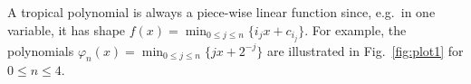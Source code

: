 A tropical polynomial is always a piece-wise linear function since, e.g.\ in one variable, it has shape $f(x)=\min_{0\leq j\leq n}\{i_{j}x+c_{i_{j}}\}$.
For example, the polynomials $\varphi_{n}(x)=\min_{0\leq j\leq n}\{jx+2^{-j}\}$
are illustrated in Fig.~\ref{fig:plot1} for $0\leq n \leq 4$.

%
%
%
%
%
%
%
%

